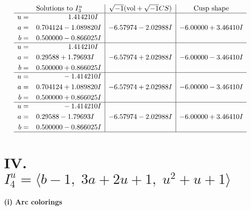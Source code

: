 \documentclass[1p]{elsarticle_modified}
\theoremstyle{definition}
\newcommand{\I}{\sqrt{-1}}
\begin{document}
$$\begin{array}{c|c|c}  
\text{Solutions to }I^u_{3}& \I (\text{vol} + \sqrt{-1}CS) & \text{Cusp shape}\\
 \hline 
\begin{aligned}
u &= \phantom{-0.000000 -}1.414210 I \\
a &= \phantom{-}0.704124 - 1.089820 I \\
b &= \phantom{-}0.500000 - 0.866025 I\end{aligned}
 & -6.57974 - 2.02988 I & -6.00000 + 3.46410 I \\ \hline\begin{aligned}
u &= \phantom{-0.000000 -}1.414210 I \\
a &= \phantom{-}0.29588 + 1.79693 I \\
b &= \phantom{-}0.500000 + 0.866025 I\end{aligned}
 & -6.57974 + 2.02988 I & -6.00000 - 3.46410 I \\ \hline\begin{aligned}
u &= \phantom{-0.000000 } -1.414210 I \\
a &= \phantom{-}0.704124 + 1.089820 I \\
b &= \phantom{-}0.500000 + 0.866025 I\end{aligned}
 & -6.57974 + 2.02988 I & -6.00000 - 3.46410 I \\ \hline\begin{aligned}
u &= \phantom{-0.000000 } -1.414210 I \\
a &= \phantom{-}0.29588 - 1.79693 I \\
b &= \phantom{-}0.500000 - 0.866025 I\end{aligned}
 & -6.57974 - 2.02988 I & -6.00000 + 3.46410 I\\
 \hline 
 \end{array}$$\newpage\newpage\renewcommand{\arraystretch}{1}
\centering \section*{IV. $I^u_{4}= \langle b-1,\;3 a+2 u+1,\;u^2+u+1 \rangle$}
\flushleft \textbf{(i) Arc colorings}\\
\end{document}
